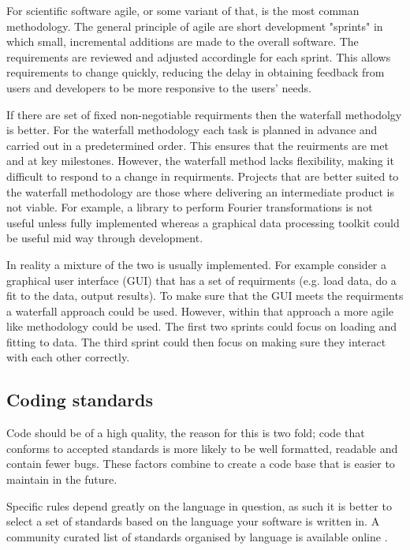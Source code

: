 \documentclass[jnr]{iosart2x}
\begin{document}
For scientific software agile, or some variant of that, is the most comman methodology.
The general principle of agile are short development "sprints" in which small, incremental additions are made to the overall software.
The requirements are reviewed and adjusted accordingle for each sprint.
This allows requirements to change quickly, reducing the delay in obtaining feedback from users and developers to be more responsive to the users' needs.

If there are set of fixed non-negotiable requirments then the waterfall methodolgy is better.
For the waterfall methodology each task is planned in advance and carried out in a predetermined order.
This ensures that the reuirments are met and at key milestones.
However, the waterfall method lacks flexibility, making it difficult to respond to a change in requirments.
Projects that are better suited to the waterfall methodology are those where delivering an intermediate product is not viable.
For example, a library to perform Fourier transformations is not useful unless fully implemented whereas a graphical data processing toolkit could be useful mid way through development.

In reality a mixture of the two is usually implemented.
For example consider a graphical user interface (GUI) that has a set of requirments (e.g. load data, do a fit to the data, output results).
To make sure that the GUI meets the requirments a waterfall approach could be used.
However, within that approach a more agile like methodology could be used.
The first two sprints could focus on loading and fitting to data.
The third sprint could then focus on making sure they interact with each other correctly.

\subsection{Coding standards}
\label{Coding standards}

Code should be of a high quality, the reason for this is two fold; code that conforms to accepted standards is more likely to be well formatted, readable and contain fewer bugs.
These factors combine to create a code base that is easier to maintain in the future.

Specific rules depend greatly on the language in question, as such it is better to select a set of standards based on the language your software is written in.
A community curated list of standards organised by language is available online \cite{Awesome_Guidelines}.
\end{document}
